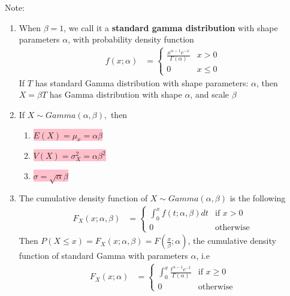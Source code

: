 \documentclass[11pt,oneside]{book}
\theoremstyle{newStyle}
\newcommand{\note}{\color{red}Note: \color{black}}
\begin{document}
\note \begin{enumerate}
\item When $\beta=1$, we call it a \textbf{standard gamma distribution} with shape parameters $\alpha$, with probability density function \begin{align*}
f(x;\alpha)&=\begin{cases}
\frac{x^{\alpha-1}e^{-x}}{\Gamma(\alpha)}& x> 0\\
0 & x\leq 0
\end{cases}
\end{align*}If $T$ has standard Gamma distribution with shape parameters: $\alpha$, then $X=\beta T$ has Gamma distribution with shape $\alpha$, and scale $\beta$
\item If $X\sim Gamma(\alpha,\beta),$ then \begin{enumerate}
\item \colorbox{pink}{$E(X)=\mu_x=\alpha \beta$}
\item \colorbox{pink}{$V(X)=\sigma_X^2=\alpha \beta^2$}
\item \colorbox{pink}{$\sigma=\sqrt{\alpha} \beta$}
\end{enumerate}
\item The cumulative density function of $X\sim Gamma(\alpha,\beta)$ is the following \begin{align*}
F_X(x;\alpha,\beta)&=\begin{cases}
\int_{0}^{x}f(t;\alpha,\beta)dt &\text{if }x>0\\
0 &\text{otherwise}
\end{cases}
\end{align*}
Then $P(X\leq x)=F_X(x;\alpha,\beta)=F\left(\frac{x}{\beta};\alpha \right)$, the cumulative density function of standard Gamma with parameters $\alpha$, i.e \begin{align*}
F_X(x;\alpha)&=\begin{cases}
\int_{0}^x\frac{t^{\alpha-1}e^{-t}}{\Gamma(\alpha)}& \text{if }x\geq 0\\
0 & \text{otherwise}
\end{cases}
\end{align*}
\end{enumerate}
\end{document}
